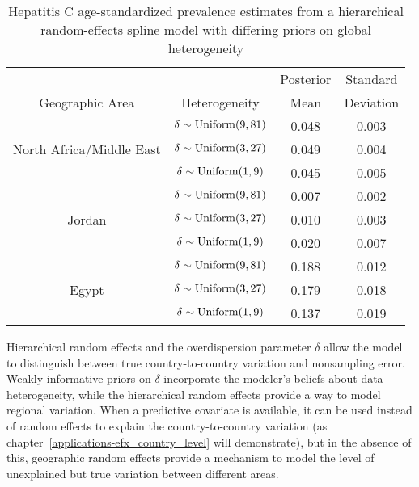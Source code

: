     \begin{table}[h]
        \begin{center}
        \begin{tabular}{|c|c|c|c|}
            \hline
                & & Posterior & Standard \\
                Geographic Area & Heterogeneity & Mean & Deviation \\
            \hline
                & $\delta \sim \operatorname{Uniform}(9,81)$ & 0.048 & 0.003 \\
                North Africa/Middle East & $\delta \sim \operatorname{Uniform}(3,27)$ & 0.049 & 0.004 \\
                & $\delta \sim \operatorname{Uniform}(1,9)$ & 0.045 & 0.005 \\
            \hline
                & $\delta \sim \operatorname{Uniform}(9,81)$ & 0.007 & 0.002 \\
                Jordan & $\delta \sim \operatorname{Uniform}(3,27)$ & 0.010 & 0.003 \\
                & $\delta \sim \operatorname{Uniform}(1,9)$ & 0.020 & 0.007 \\
            \hline
                & $\delta \sim \operatorname{Uniform}(9,81)$ & 0.188 & 0.012 \\
                Egypt & $\delta \sim \operatorname{Uniform}(3,27)$ & 0.179 & 0.018 \\
                & $\delta \sim \operatorname{Uniform}(1,9)$ & 0.137 & 0.019 \\
            \hline
        \end{tabular}
        \end{center}
        \caption{ Hepatitis C age-standardized prevalence estimates
          from a hierarchical random-effects spline model with differing
          priors on global heterogeneity}
        \label{tab:app-hepc global rfx}
    \end{table}

Hierarchical random effects and the overdispersion parameter
$\delta$ allow the model to distinguish between true
country-to-country variation and nonsampling error.  Weakly
informative priors on $\delta$ incorporate the modeler's beliefs about
data heterogeneity, while the hierarchical random effects provide a way
to model regional variation.  When a predictive covariate is
available, it can be used instead of random effects to explain the
country-to-country variation (as
chapter~\ref{applications-efx_country_level} will demonstrate), but in
the absence of this, geographic random effects provide a mechanism to
model the level of unexplained but true variation between different
areas.

